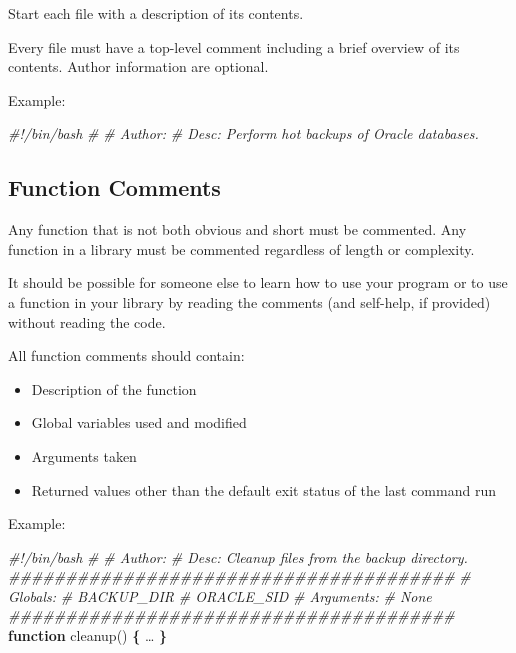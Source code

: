 \documentclass[
]{book}
\newenvironment{Shaded}{\begin{snugshade}}{\end{snugshade}}
\newcommand{\CommentTok}[1]{\textcolor[rgb]{0.56,0.35,0.01}{\textit{#1}}}
\newcommand{\FunctionTok}[1]{\textcolor[rgb]{0.00,0.00,0.00}{#1}}
\newcommand{\KeywordTok}[1]{\textcolor[rgb]{0.13,0.29,0.53}{\textbf{#1}}}
\newcommand{\NormalTok}[1]{#1}
\providecommand{\tightlist}{%
  \setlength{\itemsep}{0pt}\setlength{\parskip}{0pt}}
\begin{document}
Start each file with a description of its contents.

Every file must have a top-level comment including a brief overview of its
contents. Author information are optional.

Example:

\begin{Shaded}
\begin{Highlighting}[]
\CommentTok{#!/bin/bash}
\CommentTok{# }
\CommentTok{# Author: }
\CommentTok{# Desc: Perform hot backups of Oracle databases.}
\end{Highlighting}
\end{Shaded}

\hypertarget{function-comments}{%
\subsection{Function Comments}\label{function-comments}}

Any function that is not both obvious and short must be commented. Any function
in a library must be commented regardless of length or complexity.

It should be possible for someone else to learn how to use your program or to
use a function in your library by reading the comments (and self-help, if
provided) without reading the code.

All function comments should contain:

\begin{itemize}
\tightlist
\item
  Description of the function
\item
  Global variables used and modified
\item
  Arguments taken
\item
  Returned values other than the default exit status of the last command run
\end{itemize}

Example:

\begin{Shaded}
\begin{Highlighting}[]
\CommentTok{#!/bin/bash}
\CommentTok{# }
\CommentTok{# Author:}
\CommentTok{# Desc: Cleanup files from the backup directory.}
\CommentTok{#######################################}
\CommentTok{# Globals:}
\CommentTok{#   BACKUP_DIR}
\CommentTok{#   ORACLE_SID}
\CommentTok{# Arguments:}
\CommentTok{#   None}
\CommentTok{#######################################}
\KeywordTok{function}\FunctionTok{ cleanup()} \KeywordTok{\{}
\NormalTok{  …}
\KeywordTok{\}}
\end{Highlighting}
\end{Shaded}
\end{document}
